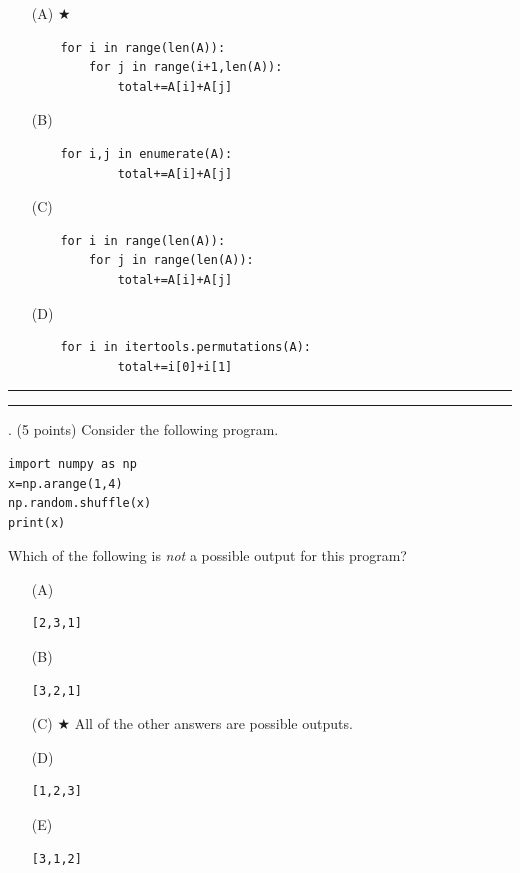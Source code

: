 \documentclass{article}
\begin{document}
\begin{enumerate}
\item[(A)] $\bigstar$ 
\begin{verbatim}
    for i in range(len(A)):
        for j in range(i+1,len(A)):
            total+=A[i]+A[j]
\end{verbatim}

\item[(B)]
\begin{verbatim}
    for i,j in enumerate(A):
            total+=A[i]+A[j]
\end{verbatim}

\item[(C)]
\begin{verbatim}
    for i in range(len(A)):
        for j in range(len(A)):
            total+=A[i]+A[j]
\end{verbatim}

\item[(D)]
\begin{verbatim}
    for i in itertools.permutations(A):
            total+=i[0]+i[1]
\end{verbatim}

\end{enumerate}

\vspace*{2em}
\hrule
\vspace{2em}

\vspace{2em}
\hrule height 2pt


\newpage
{}. (5 points)
Consider the following program.
\begin{verbatim}
import numpy as np
x=np.arange(1,4)
np.random.shuffle(x)
print(x)
\end{verbatim}
Which of the following is \emph{not} a possible output for this program?


\begin{enumerate}
\item[(A)]
\begin{verbatim}[2,3,1]\end{verbatim}

\item[(B)]
\begin{verbatim}[3,2,1]\end{verbatim}

\item[(C)] $\bigstar$ 
All of the other answers are possible outputs.

\item[(D)]
\begin{verbatim}[1,2,3]\end{verbatim}

\item[(E)]
\begin{verbatim}[3,1,2]\end{verbatim}

\end{enumerate}
\end{document}
